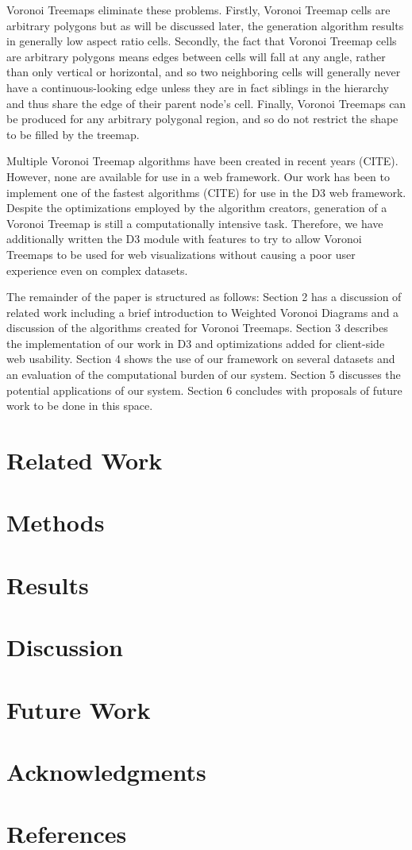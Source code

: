 \documentclass{acm_proc_article-sp}
\begin{document}
Voronoi Treemaps eliminate these problems. Firstly, Voronoi Treemap
cells are arbitrary polygons but as will be discussed later, the
generation algorithm results in generally low aspect ratio
cells. Secondly, the fact that Voronoi Treemap cells are arbitrary
polygons means edges between cells will fall at any angle, rather
than only vertical or horizontal, and so two neighboring cells will
generally never have a continuous-looking edge unless they are in fact
siblings in the hierarchy and thus share the edge of their parent
node's cell. Finally, Voronoi Treemaps can be produced for any
arbitrary polygonal region, and so do not restrict the shape to be
filled by the treemap.

Multiple Voronoi Treemap algorithms have been created in recent years
(CITE). However, none are available for use in a web framework.  Our
work has been to implement one of the fastest algorithms (CITE) for
use in the D3 web framework. Despite the optimizations employed by the
algorithm creators, generation of a Voronoi Treemap is still a
computationally intensive task. Therefore, we have additionally
written the D3 module with features to try to allow Voronoi Treemaps
to be used for web visualizations without causing a poor user
experience even on complex datasets.

The remainder of the paper is structured as follows: Section 2 has a
discussion of related work including a brief introduction to Weighted Voronoi
Diagrams and a discussion of the algorithms created for Voronoi
Treemaps. Section 3 describes the implementation of our work in D3 and
optimizations added for client-side web usability. Section 4 shows the
use of our framework on several datasets and an evaluation of the
computational burden of our system. Section 5 discusses the potential
applications of our system. Section 6 concludes with proposals of
future work to be done in this space.

\section{Related Work}


\section{Methods}


\section{Results}


\section{Discussion}


\section{Future Work}


\section{Acknowledgments}


\section{References}
\end{document}
